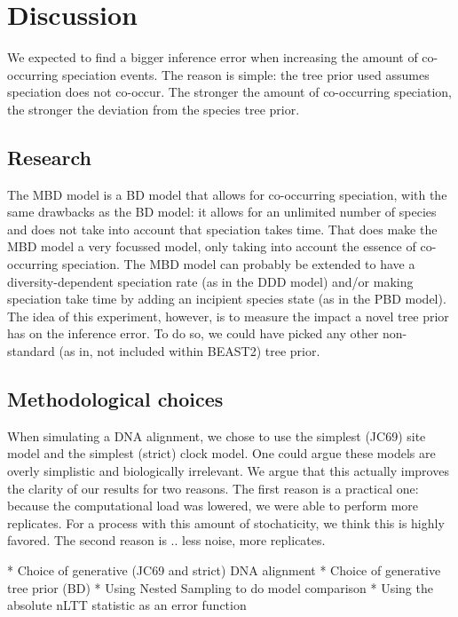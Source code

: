 \section{Discussion}

We  expected to find a bigger inference error 
when increasing the amount of co-occurring speciation events.
The reason is simple: the tree prior used assumes speciation does not
co-occur. The stronger the amount of co-occurring speciation, the stronger
the deviation from the species tree prior.

\subsection{Research}

The MBD model is a BD model that allows for co-occurring speciation,
with the same drawbacks as the BD model: it allows for an unlimited 
number of species and does not take into account that speciation takes time.
That does make the MBD model a very focussed model, only taking into 
account the essence of co-occurring speciation. The MBD model can probably
be extended to have a diversity-dependent speciation rate (as in the 
DDD model) and/or making speciation take time by adding 
an incipient species state (as in the PBD model).
The idea of this experiment, however, is to measure the impact a novel
tree prior has on the inference error. To do so, we could have picked
any other non-standard (as in, not included within BEAST2) tree prior.

\subsection{Methodological choices}

When simulating a DNA alignment, we chose to use the simplest (JC69) site
model and the simplest (strict) clock model. One could argue these models
are overly simplistic and biologically irrelevant. We argue that this
actually improves the clarity of our results for two reasons. The first
reason is a practical one: because the computational load was lowered,
we were able to perform more replicates. For a process with this
amount of stochaticity, we think this is highly favored. The second reason
is .. less noise,
more replicates.


 * Choice of generative (JC69 and strict) DNA alignment 
 * Choice of generative tree prior (BD)
 * Using Nested Sampling to do model comparison
 * Using the absolute nLTT statistic as an error function

